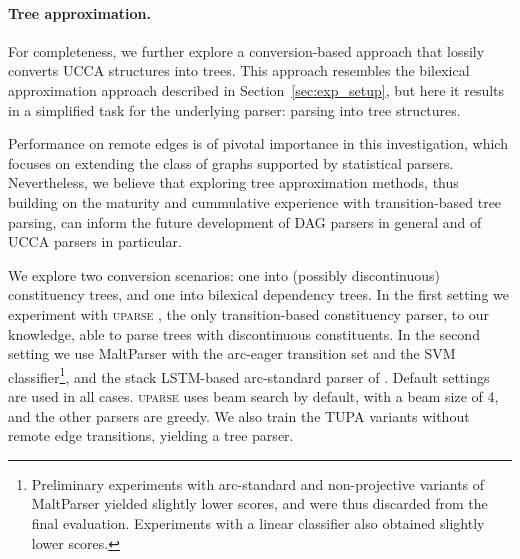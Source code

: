 \documentclass[11pt]{article}
\newcommand{\parser}[1]{TUPA\textsubscript{#1}}
\newcommand{\secref}[1]{Section~\ref{#1}}
\begin{document}
\paragraph{Tree approximation.}
For completeness, we further explore a conversion-based approach that
lossily converts UCCA structures into trees. 
This approach resembles the bilexical approximation approach described in \secref{sec:exp_setup}, but here it results in a simplified task for the underlying parser: parsing into tree structures.

Performance on remote edges is of pivotal importance in this investigation, which focuses on extending the class of graphs supported by statistical parsers. Nevertheless, we believe that exploring tree approximation methods, thus building on the maturity and cummulative experience with transition-based tree parsing, can inform the future development of DAG parsers in general and of UCCA parsers in particular.

We explore two conversion scenarios: one into (possibly discontinuous) constituency trees,
and one into bilexical dependency trees. In the first setting we experiment with \textsc{uparse}
\cite{maier-lichte:2016:DiscoNLP},
the only transition-based constituency parser, to our knowledge, able to parse trees with
discontinuous constituents.
In the second setting we use MaltParser \cite{nivre2007maltparser} with the
arc-eager transition set and the SVM classifier\footnote{Preliminary
experiments with arc-standard and non-projective variants of MaltParser yielded slightly
lower scores, and were thus discarded from the final evaluation.
Experiments with a linear classifier also obtained slightly lower scores.},
and the stack LSTM-based arc-standard parser of .
Default settings are used in all cases.
\textsc{uparse} uses beam search by default,
with a beam size of 4, and the other parsers are greedy.
We also train the \parser{} variants without remote edge transitions, yielding a tree parser.
\end{document}
